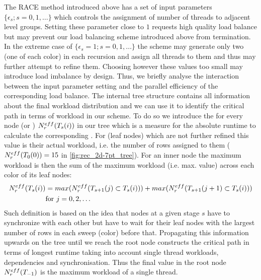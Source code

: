 

The RACE method introduced above has a set of input parameters $\{\epsilon_s; s=0,1,\ldots\}$ which controls the assignment of number of threads to adjacent level groups. Setting these parameter close to $1$ requests high quality load balance but may prevent our load balancing scheme introduced above from termination. In the extreme case of $\{\epsilon_s=1; s=0,1,\ldots\}$ the scheme may generate only two \levelGroups (one of each color) in each recursion and assign all threads to them and thus may further attempt to refine them.  Choosing however these values too small may introduce load imbalance by design.
Thus, we briefly analyse the interaction between the input parameter setting and the parallel efficiency of the corresponding load balance.  The internal tree structure contains all information about the final workload distribution and we can use it to identify the critical path in terms of workload in our scheme. To do so we introduce the \effRow for every node (or \levelGroup) $N_{r}^{eff}(T_s(i))$  in our tree which is a measure for the absolute runtime to calculate the corresponding \levelGroup. For \levelGroups (leaf nodes) which are not further refined this value is their actual workload, i.e. the number of rows assigned to them ($N_{r}^{eff}(T_0(0)) = 15$ in \cref{fig:rec_2d-7pt_tree}). For an inner node the maximum workload is then the sum of the maximum workload (i.e. max. \effRow value) across each color of its leaf nodes:
\begin{align*}
N_{r}^{eff}(T_s(i)) &= max(N_{r}^{eff}(T_{s+1}(j) \subset T_s(i))) + max(N_{r}^{eff}(T_{s+1}(j+1) \subset T_s(i)))\\
 & \text{for } j=0,2,\ldots
\end{align*}
Such definition is based on the idea that nodes at a given stage $s$ have to synchronize with each other but have to wait for their leaf nodes with the largest number of rows in each sweep (color) before that. Propagating this information upwards on the tree until we reach the root node constructs the critical path in terms of longest runtime taking into account single thread workloads, dependencies and synchronisation. Thus the final value in the root node $N_{r}^{eff}(T_{-1})$ is the maximum workload of a single thread. 

